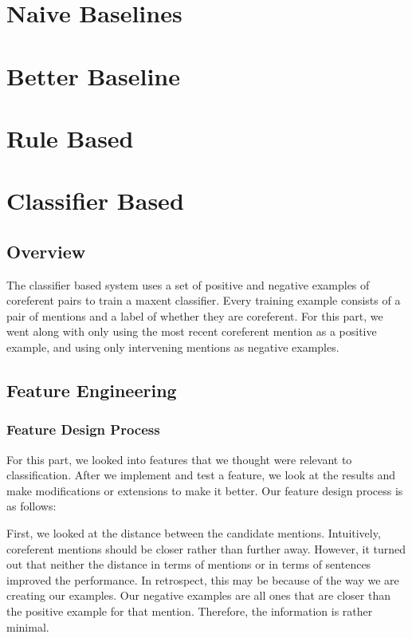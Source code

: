 \documentclass[12pt, twocolumn]{article}
\begin{document}

\section{Naive Baselines}

\section{Better Baseline}

\section{Rule Based}

\section{Classifier Based}
\subsection{Overview}
The classifier based system uses a set of positive and negative examples of coreferent pairs to train a maxent classifier. Every training example consists of a pair of mentions and a label of whether they are coreferent. For this part, we went along with only using the most recent coreferent mention as a positive example, and using only intervening mentions as negative examples. 
\subsection{Feature Engineering}
\subsubsection{Feature Design Process}
For this part, we looked into features that we thought were relevant to classification. After we implement and test a feature, we look at the results and make modifications or extensions to make it better. Our feature design process is as follows:

First, we looked at the distance between the candidate mentions. Intuitively, coreferent mentions should be closer rather than further away. However, it turned out that neither the distance in terms of mentions or in terms of sentences improved the performance. In retrospect, this may be because of the way we are creating our examples. Our negative examples are all ones that are closer than the positive example for that mention. Therefore, the information is rather minimal.
\end{document}
